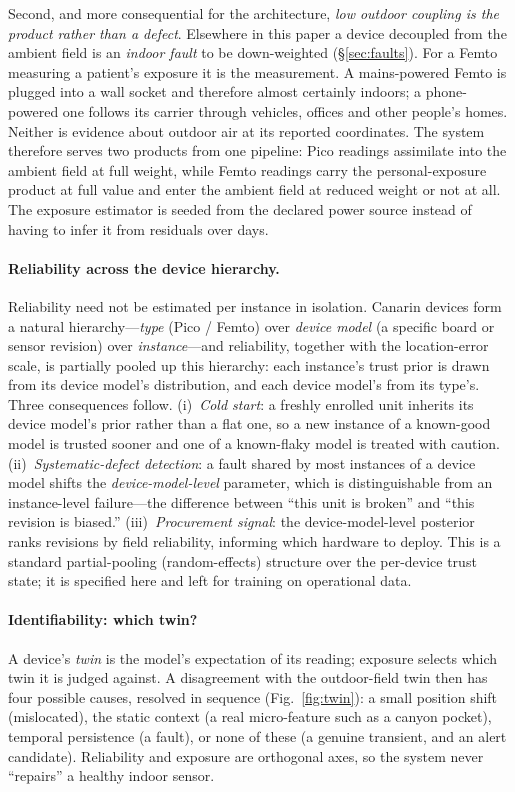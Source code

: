 \documentclass[10pt]{article}
\begin{document}
Second, and more consequential for the architecture, \emph{low outdoor coupling is
the product rather than a defect}. Elsewhere in this paper a device decoupled from
the ambient field is an \emph{indoor fault} to be down-weighted
(\S\ref{sec:faults}). For a Femto measuring a patient's exposure it is the
measurement. A mains-powered Femto is plugged into a wall socket and therefore
almost certainly indoors; a phone-powered one follows its carrier through vehicles,
offices and other people's homes. Neither is evidence about outdoor air at its
reported coordinates. The system therefore serves two products from one pipeline:
Pico readings assimilate into the ambient field at full weight, while Femto
readings carry the personal-exposure product at full value and enter the ambient
field at reduced weight or not at all. The exposure estimator is seeded from the
declared power source instead of having to infer it from residuals over days.

\paragraph{Reliability across the device hierarchy.}
Reliability need not be estimated per instance in isolation. Canarin devices form a
natural hierarchy---\emph{type} (Pico / Femto) over \emph{device model} (a specific
board or sensor revision) over \emph{instance}---and reliability, together with the
location-error scale, is partially pooled up this hierarchy: each instance's trust
prior is drawn from its device model's distribution, and each device model's from
its type's. Three consequences follow. (i)~\emph{Cold start}: a freshly enrolled
unit inherits its device model's prior rather than a flat one, so a new instance of
a known-good model is trusted sooner and one of a known-flaky model is treated with
caution. (ii)~\emph{Systematic-defect detection}: a fault shared by most instances
of a device model shifts the \emph{device-model-level} parameter, which is
distinguishable from an instance-level failure---the difference between ``this unit
is broken'' and ``this revision is biased.'' (iii)~\emph{Procurement signal}: the
device-model-level posterior ranks revisions by field reliability, informing which
hardware to deploy. This is a standard partial-pooling (random-effects) structure
over the per-device trust state; it is specified here and left for training on
operational data.

\paragraph{Identifiability: which twin?}
A device's \emph{twin} is the model's expectation of its reading; exposure selects
which twin it is judged against. A disagreement with the outdoor-field twin then
has four possible causes, resolved in sequence (Fig.~\ref{fig:twin}): a small
position shift (mislocated), the static context (a real micro-feature such as a
canyon pocket), temporal persistence (a fault), or none of these (a genuine
transient, and an alert candidate). Reliability and exposure are orthogonal axes,
so the system never ``repairs'' a healthy indoor sensor.
\end{document}

